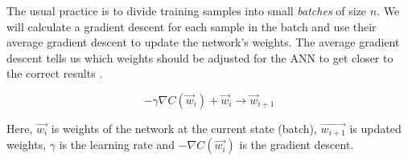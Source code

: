 The usual practice is to divide training samples into small \textit{batches} of size $n$. We will calculate a gradient descent for each sample in the batch and use their average gradient descent to update the network's weights. The average gradient descent tells us which weights should be adjusted for the ANN to get closer to the correct results \cite{birlliantbackprop}.

\begin{equation}
    {- \gamma \nabla C(\vec{w}_i) + \vec{w}_i \rightarrow \vec{w}_{i+1} }
\end{equation}

Here, $\vec{w_i}$ is weights of the network at the current state (batch), $\vec{w_{i+1}}$ is updated weights, $\gamma$ is the learning rate and $-\nabla C(\vec{w_i})$ is the gradient descent.
